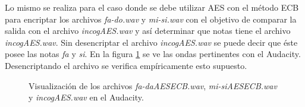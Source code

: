 \documentclass[a4paper,10pt]{article}
\begin{document}
Lo mismo se realiza para el caso donde se debe utilizar AES con el m\'etodo ECB para encriptar
los archivos \emph{fa-do.wav} y \emph{mi-si.wav} con el objetivo de comparar la salida
con el archivo \emph{incogAES.wav} y as\'i determinar que notas tiene el archivo
\emph{incogAES.wav}. Sin desencriptar el archivo \emph{incogAES.wav} se puede decir que \'este
posee las notas \emph{fa} y \emph{si}. En la figura \ref{fig:AESAudacityCmp} se ve las ondas
pertinentes con el Audacity. Desencriptando el archivo se verifica empíricamente esto supuesto.
\begin{figure}
	\begin{center}
	\end{center}
	\caption{Visualización de los archivos \emph{fa-daAESECB.wav}, \emph{mi-siAESECB.wav} y
		\emph{incogAES.wav} en el Audacity.}
	\label{fig:AESAudacityCmp}
\end{figure}
\end{document}

